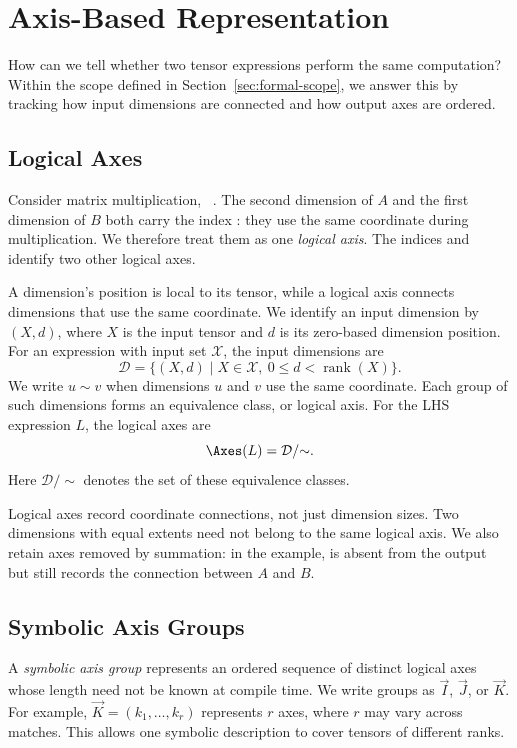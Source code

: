 \section{Axis-Based Representation}
\label{sec:axis-model}
How can we tell whether two tensor expressions perform the same computation?
Within the scope defined in Section~\ref{sec:formal-scope}, we answer this
by tracking how input dimensions are connected and how output axes are ordered.

\subsection{Logical Axes}
\label{sec:logical-axes}
Consider matrix multiplication,
~\cite{numpy-einsum}.
The second dimension of $A$ and the first dimension of $B$ both
carry the index : they use the same coordinate during
multiplication. We therefore treat them as one \emph{logical axis}.
The indices  and  identify two other logical axes.

A dimension's position is local to its tensor, while a logical axis
connects dimensions that use the same coordinate.
We identify an input dimension by $(X,d)$, where $X$ is the input
tensor and $d$ is its zero-based dimension position.
For an expression with input set $\mathcal X$, the input dimensions are
\begin{equation}
 \mathcal D=\{(X,d)\mid X\in\mathcal X,\ 0\le d<\operatorname{rank}(X)\}.
\end{equation}
We write $u\sim v$ when dimensions $u$ and $v$ use the same coordinate.
Each group of such dimensions forms an equivalence class, or logical
axis. For the LHS expression $L$, the logical axes are
\begin{equation}
 \Axes(L)=\mathcal D/{\sim}.
\end{equation}
Here $\mathcal D/{\sim}$ denotes the set of these equivalence classes.

Logical axes record coordinate connections, not just dimension sizes.
Two dimensions with equal extents need not belong to the same logical
axis. We also retain axes removed by summation: in the example,
 is absent from the output but still records the connection
between $A$ and $B$.

\subsection{Symbolic Axis Groups}
\label{sec:symbolic-axis-groups}
A \emph{symbolic axis group} represents an ordered sequence of distinct
logical axes whose length need not be known at compile time. We write groups
as $\vec I$, $\vec J$, or $\vec K$. For example,
$\vec K=(k_1,\ldots,k_r)$ represents $r$ axes, where $r$ may vary across
matches. This allows one symbolic description to cover tensors of different
ranks.

